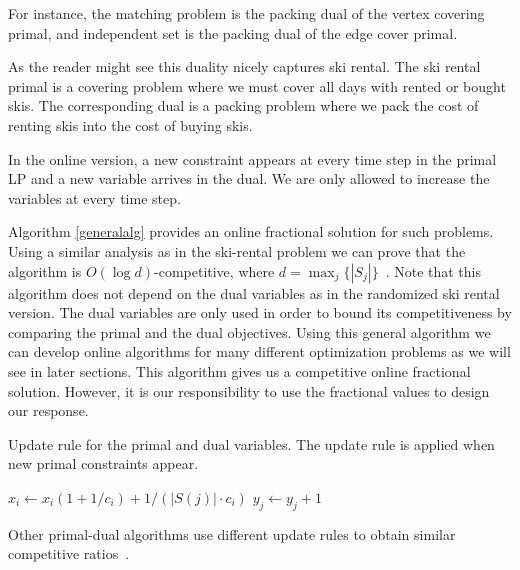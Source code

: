 For instance, the matching problem is the packing dual of the vertex covering primal, and independent set is the packing dual of the edge cover primal.

As the reader might see this duality nicely captures ski rental.
The ski rental primal is a covering problem where we must cover all days with rented or bought skis. 
The corresponding dual is a packing problem where we pack the cost of renting skis into the cost of buying skis.

In the online version, a new constraint appears at every time step in the primal LP and a new variable arrives in the dual. We are only allowed to increase the variables at every time step.

Algorithm \ref{generalalg} provides an online fractional solution for such problems. Using a similar analysis as in the ski-rental problem we can prove that the algorithm is $O(\log d)$-competitive, where \mbox{$d = \max_j\{|S_j|\}$}~\cite{buchbinder09:survey}.
Note that this algorithm does not depend on the dual variables as in the randomized ski rental version. The dual variables are only used in order to bound its competitiveness by comparing the primal and the dual objectives.
Using this general algorithm we can develop online algorithms for many different optimization problems as we will see in later sections. This algorithm gives us a competitive online fractional solution. However, it is our responsibility to use the fractional values to design our response.

\begin{algorithm}
\caption{Update rule for the primal and dual variables. The update rule is applied when new primal constraints appear.}
\label{generalalg}
\begin{algorithmic}[1]
    \STATE $x_i \leftarrow x_i (1 + 1/c_i) + 1/(|S(j)| \cdot c_i)$ 
  \ENDFOR
  \STATE $y_j \leftarrow y_j + 1$
\ENDWHILE
\end{algorithmic}
\end{algorithm}

Other primal-dual algorithms use different update rules to obtain similar competitive ratios~\cite{buchbinder09:survey}.
